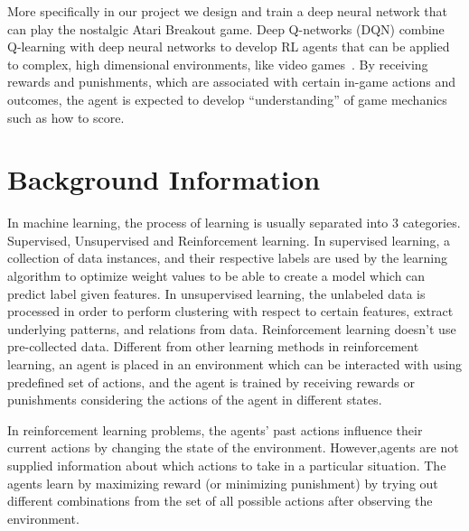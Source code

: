 \documentclass[a4paper, 12pt, conference]{IEEEtran}
\begin{document}
More specifically in our project we design and train a deep neural network that can play the nostalgic Atari\texttrademark{} Breakout game. Deep Q-networks (DQN) combine Q-learning with deep neural networks to develop RL agents that can be applied to complex, high dimensional environments, like video games~\autocite{openai}. By receiving rewards and punishments, which are associated with certain in-game actions and outcomes, the agent is expected to develop ``understanding'' of game mechanics such as how to score.

\section{Background Information}
In machine learning, the process of learning is usually separated into 3 categories. Supervised, Unsupervised and Reinforcement learning. In supervised learning, a collection of data instances, and their respective labels are used by the learning algorithm to optimize weight values to be able to create a model which can predict label given features. In unsupervised learning, the unlabeled data is processed in order to perform clustering with respect to certain features, extract underlying patterns, and relations from data. Reinforcement learning doesn't use pre-collected data. Different from other learning methods in reinforcement learning, an agent is placed in an environment which can be interacted with using predefined set of actions, and the agent is trained by receiving rewards or punishments considering the actions of the agent in different states.

In reinforcement learning problems, the agents' past actions influence their current actions by changing the state of the environment. However,agents are not supplied information about which actions to take in a particular situation. The agents learn by maximizing reward (or minimizing punishment) by trying out different combinations from the set of all possible actions after observing the environment.
\end{document}
